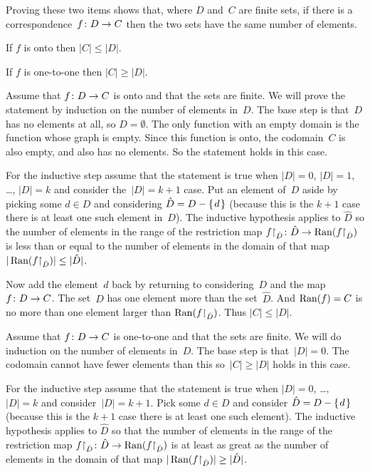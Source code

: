 \documentclass{test}  %
\begin{document}
\begin{ex}   \label{CorrespondingSetsHaveSameNumberOfElements}
  Proving these two items shows that, 
  where $D$ and~$C$ are finite sets, 
  if there is a correspondence~$\mbox{$f\colon D\to C$}$
  then the two sets have the same number of elements.
\begin{exes}
\item If $f$ is onto then $|C|\leq |D|$.
\item If $f$ is one-to-one then $|C|\geq |D|$.
\end{exes}
\begin{ans}
\begin{exes}
\item Assume that $\mbox{$f\colon D\to C$}$ is onto and
  that the sets are finite.
  We will prove the statement by induction on the number of elements in~$D$.
  The base step is that~$D$ has no elements at all, so $D=\emptyset$.
  The only function with an empty domain is the function whose graph is 
  empty. 
  Since this function is onto, the codomain~$C$ is also empty, 
  and also has no elements.
  So the statement holds in this case.

  For the inductive step assume that the statement is true when $|D|=0$, 
  $|D|=1$, \ldots, $|D|=k$ and consider the~$|D|=k+1$ case.
  Put an element of~$D$ aside by picking some $d\in D$ and considering 
  $\hat{D}=D-\mbox{$\{\hspace{0.1em}d\hspace{0.1em}\}$}$ (because this is the $k+1$ case there is at least
  one such element in~$D$).
  The inductive hypothesis applies to $\hat{D}$ so the number of elements in
  the range of the restriction map 
  $\mbox{${f}\mathord\upharpoonright_{\hat{D}}\colon \hat{D}\to \operatorname{Ran}({f}\mathord\upharpoonright_{\hat{D}})$}$
  is less than or equal to the number of elements in the domain of that map
  $|\operatorname{Ran}({f}\mathord\upharpoonright_{\hat{D}})|\leq |\hat{D}|$.

  Now add the element~$d$ back by returning to considering~$D$ and the 
  map~$\mbox{$f\colon D\to C$}$.
  The set~$D$ has one element more than the set~$\hat{D}$.
  And $\operatorname{Ran}(f)=C$ is no more than one element larger than
  $\operatorname{Ran}({f}\mathord\upharpoonright_{\hat{D}})$.
  Thus $|C|\leq|D|$.
\item Assume that $\mbox{$f\colon D\to C$}$ is one-to-one and
  that the sets are finite.
  We will do induction on the number of elements in~$D$.
  The base step is that~$|D|=0$.
  The codomain cannot have fewer elements than this
  so~$|C|\geq |D|$ holds in this case.

  For the inductive step assume that the statement is true when $|D|=0$, 
  \ldots, $|D|=k$ and consider~$|D|=k+1$.
  Pick some $d\in D$ and consider 
  $\hat{D}=D-\mbox{$\{\hspace{0.1em}d\hspace{0.1em}\}$}$ (because this is the $k+1$ case there is at least
  one such element).
  The inductive hypothesis applies to $\hat{D}$ so that 
  the number of elements in the range of the restriction map 
  $\mbox{${f}\mathord\upharpoonright_{\hat{D}}\colon \hat{D}\to \operatorname{Ran}({f}\mathord\upharpoonright_{\hat{D}})$}$
  is at least as great as the number of elements in the domain of that map
  $|\operatorname{Ran}({f}\mathord\upharpoonright_{\hat{D}})|\geq |\hat{D}|$.


\end{exes}
\end{ans}
\end{ex}
\end{document}
